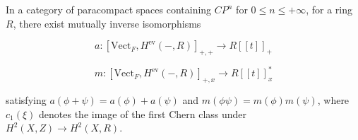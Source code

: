In a category of paracompact spaces containing $CP^n$ for $0 \leq n \leq +\infty$, for a ring $R$, there exist mutually inverse isomorphisms

$$a: [\text{Vect}_F, H^{\text{ev}}(-, R)]_{+,+} \rightarrow R[[t]]_+$$

$$m: [\text{Vect}_F, H^{\text{ev}}(-, R)]_{+,x} \rightarrow R[[t]]_x^*$$

satisfying $a(\phi + \psi) = a(\phi) + a(\psi)$ and $m(\phi\psi) = m(\phi)m(\psi)$, where $c_1(\xi)$ denotes the image of the first Chern class under $H^2(X, Z) \rightarrow H^2(X, R)$.
